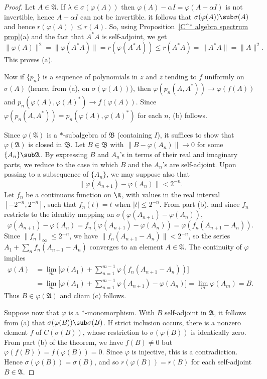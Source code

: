 \begin{proof}
Let $A\in\mathfrak{A}$. If $\lambda\in\sigma(\varphi(A))$ then $\varphi(A)-\alpha I=\varphi(A-\alpha I)$ is not invertible, hence $A-\alpha I$ can not be invertible. it follows that $\sigma(\varphi(A))\sub\sigma(A)$ and hence $r(\varphi(A))\leq r(A)$. So, using Proposition~\ref{C^* algebra spectrum prop}(a) and the fact that $A^*A$ is self-adjoint, we get
\[\|\varphi(A)\|^2=\|\varphi(A^*A)\|=r(\varphi(A^*A))\leq r(A^*A)=\|A^*A\|=\|A\|^2.\]
This proves (a).\par
Now if $\{p_n\}$ is a sequence of polynomials in $z$ and $\bar{z}$ tending to $f$ uniformly on $\sigma(A)$ (hence, from (a), on $\sigma(\varphi(A))$), then $\varphi(p_n(A,A^*))\to\varphi(f(A))$ and $p_n(\varphi(A),\varphi(A)^*)\to f(\varphi(A))$. Since $\varphi(p_n(A,A^*))=p_n(\varphi(A),\varphi(A)^*)$ for each $n$, (b) follows.\par
Since $\varphi(\mathfrak{A})$ is a $*$-subalgebra of $\mathfrak{B}$ (containing $I$), it suffices to show that $\varphi(\mathfrak{A})$ is closed in $\mathfrak{B}$. Let $B\in\mathfrak{B}$ with $\|B-\varphi(A_n)\|\to 0$ for some $\{A_n\}\sub\mathfrak{A}$. By expressing $B$ and $A_n$'s in terms of their real and imaginary parts, we reduce to the case in which $B$ and the $A_n$'s are self-adjoint. Upon passing to a subsequence of $\{A_n\}$, we may suppose also that
\[\|\varphi(A_{n+1})-\varphi(A_n)\|<2^{-n}.\]
Let $f_n$ be a continuous function on $\R$, with values in the real interval $[-2^{-n},2^{-n}]$, such that $f_n(t)=t$ when $|t|\leq 2^{-n}$. From part (b), and since $f_n$ restricts to the identity mapping on $\sigma(\varphi(A_{n+1})-\varphi(A_n))$,
\[\varphi(A_{n+1})-\varphi(A_n)=f_n(\varphi(A_{n+1})-\varphi(A_n))=\varphi(f_n(A_{n+1}-A_n)).\]
Since $\|f_n\|_\infty\leq 2^{-n}$, we have $\|f_n(A_{n+1}-A_n)\|<2^{-n}$, so the series $A_1+\sum_nf_n(A_{n+1}-A_n)$ converges to an element $A\in\mathfrak{A}$. The continuity of $\varphi$ implies
\begin{align*}
\varphi(A)&=\lim_m\Big[\varphi(A_1)+\sum_{n=1}^{m-1}\varphi(f_n(A_{n+1}-A_n))\Big]\\
&=\lim_m\Big[\varphi(A_1)+\sum_{n=1}^{m-1}\varphi(A_{n+1})-\varphi(A_n)\Big]=\lim_m\varphi(A_m)=B.
\end{align*}
Thus $B\in\varphi(\mathfrak{A})$ and cliam (c) follows.\par
Suppose now that $\varphi$ is a $*$-monomorphism. With $B$ self-adjoint in $\mathfrak{A}$, it follows from (a) that $\sigma(\varphi(B))\sub\sigma(B)$. If strict inclusion occurs, there is a nonzero element $f$ of $C(\sigma(B))$, whose restriction to $\sigma(\varphi(B))$ is identically zero. From part (b) of the theorem, we have $f(B)\neq 0$ but $\varphi(f(B))=f(\varphi(B))=0$. Since $\varphi$ is injective, this is a contradiction. Hence $\sigma(\varphi(B))=\sigma(B)$, and so $r(\varphi(B))=r(B)$ for each self-adjoint $B\in\mathfrak{A}$.\par

\end{proof}
